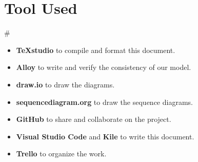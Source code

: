 \section{Tool Used}#
\label{s:Tool_Used}%

\begin{itemize}
  \item \textbf{TeXstudio} to compile and format this document.
  \item \textbf{Alloy} to write and verify the consistency of our model.
  \item \textbf{draw.io} to draw the diagrams.
  \item \textbf{sequencediagram.org} to draw the sequence diagrams.
  \item \textbf{GitHub} to share and collaborate on the project.
  \item \textbf{Visual Studio Code} and \textbf{Kile} to write this document.
  \item \textbf{Trello} to organize the work.
\end{itemize}
